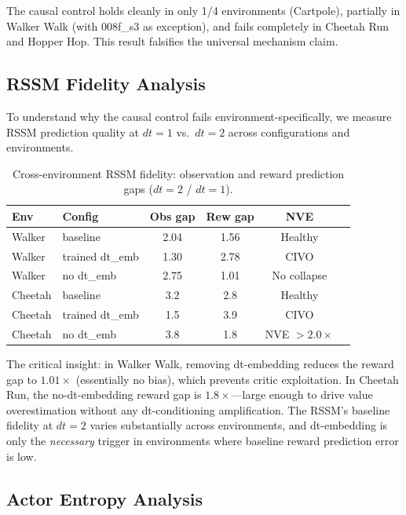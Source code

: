 \documentclass[10pt,twocolumn]{article}
\begin{document}
The causal control holds cleanly in only 1/4 environments (Cartpole), partially in Walker Walk (with 008f\_s3 as exception), and fails completely in Cheetah Run and Hopper Hop. This result falsifies the universal mechanism claim.

\subsection{RSSM Fidelity Analysis}
\label{sec:rssm-fidelity}

To understand why the causal control fails environment-specifically, we measure RSSM prediction quality at $dt=1$ vs.\ $dt=2$ across configurations and environments.

\begin{table}[h]
\centering
\caption{Cross-environment RSSM fidelity: observation and reward prediction gaps ($dt=2$ / $dt=1$).}
\label{tab:rssm-fidelity}
\begin{tabular}{llcccl}
\toprule
Env & Config & Obs gap & Rew gap & NVE \\
\midrule
Walker & baseline & 2.04 & 1.56 & Healthy \\
Walker & trained dt\_emb & 1.30 & 2.78 & CIVO \\
Walker & no dt\_emb & 2.75 & 1.01 & No collapse \\
\midrule
Cheetah & baseline & 3.2 & 2.8 & Healthy \\
Cheetah & trained dt\_emb & 1.5 & 3.9 & CIVO \\
Cheetah & no dt\_emb & 3.8 & 1.8 & NVE $>2.0\times$ \\
\bottomrule
\end{tabular}
\end{table}

The critical insight: in Walker Walk, removing dt-embedding reduces the reward gap to $1.01\times$ (essentially no bias), which prevents critic exploitation. In Cheetah Run, the no-dt-embedding reward gap is $1.8\times$---large enough to drive value overestimation without any dt-conditioning amplification. The RSSM's baseline fidelity at $dt=2$ varies substantially across environments, and dt-embedding is only the \emph{necessary} trigger in environments where baseline reward prediction error is low.

\subsection{Actor Entropy Analysis}
\label{sec:entropy}
\end{document}

